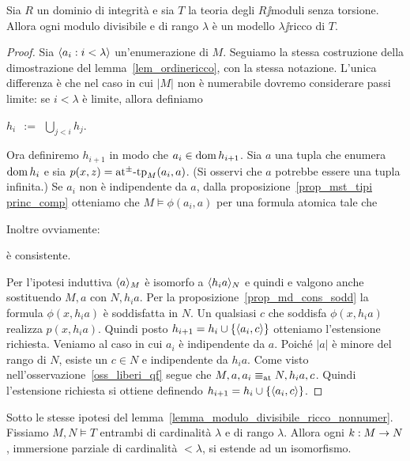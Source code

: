 \begin{lemma}\label{lemma_modulo_divisibile_ricco_nonnumer}
Sia $R$ un dominio di integrit\`a e sia $T$ la teoria degli $R\jj$moduli senza torsione.
Allora ogni modulo divisibile e di rango $\lambda$ \`e un modello $\lambda\jj$ricco di $T$.
\end{lemma}

\begin{proof}
Sia $\langle a_i:i<\lambda\rangle$ un'enumerazione di $M$. Seguiamo la stessa costruzione della dimostrazione del lemma~\ref{lem_ordinericco}, con la stessa notazione. L'unica differenza \`e che nel caso  in cui $|M|$ non \`e numerabile dovremo considerare passi limite: se $i<\lambda$ \`e limite, allora definiamo

\hfil$\displaystyle h_i\ \ :=\ \ \bigcup_{j<i} h_j$.

Ora definiremo $h_{i+1}$ in modo che $a_i\in\mathop{\rm dom} h_{i+1}$. Sia $a$ una tupla che enumera $\mathop{\rm dom} h_i$ e sia $p(x,z)={\tiny\rm at^\pm}\textrm{-tp}_M(a_i,a)$. (Si osservi che $a$ potrebbe essere una tupla infinita.) Se $a_i$ non \`e indipendente da $a$, dalla proposizione~\ref{prop_mst_tipi princ_comp} otteniamo che $M\models\phi(a_i,a)$ per una formula atomica tale che 


Inoltre ovviamente:

\hspace{3ex}\`e consistente.

Per l'ipotesi induttiva $\langle a\rangle_M$ \`e isomorfo a $\langle h_ia\rangle_N$ e quindi  e  valgono anche sostituendo $M,a$ con $N,h_ia$. Per la proposizione~\ref{prop_md_cons_sodd} la formula $\phi(x,h_ia)$ \`e soddisfatta in $N$. Un qualsiasi $c$ che soddisfa $\phi(x,h_ia)$ realizza $p(x,h_ia)$. Quindi posto $h_{i+1}=h_i\cup\{\langle a_i,c\rangle\}$ otteniamo l'estensione richiesta. Veniamo al caso in cui $a_i$ \`e indipendente da $a$. Poich\'e $|a|$ \`e minore del rango di $N$, esiste un $c\in N$ e indipendente da $h_ia$. Come visto nell'osservazione~\ref{oss_liberi_qf} segue che $M,a,a_i\equiv_{\rm at} N,h_ia,c$. Quindi l'estensione richiesta si ottiene definendo $h_{i+1}=h_i\cup\{\langle a_i,c\rangle\}$.
\end{proof}

\begin{corollary}\label{thm_ModDivUltraOmog}
Sotto le stesse ipotesi del lemma~\ref{lemma_modulo_divisibile_ricco_nonnumer}. Fissiamo $M,N\models T$ entrambi di cardinalit\`a $\lambda$ e di rango $\lambda$.  Allora ogni $k:M\rightarrow N$, immersione parziale di cardinalit\`a $<\lambda$, si estende ad un isomorfismo.
\end{corollary}

